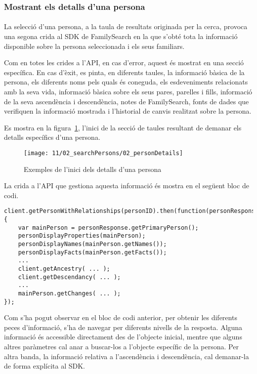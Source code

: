 \subsubsection{Mostrant els detalls d'una persona}

\paragraph{}
La selecció d'una persona, a la taula de resultats originada per la cerca, provoca una segona crida al SDK de FamilySearch en la que s'obté tota la informació disponible sobre la persona seleccionada i els seus familiars.

Com en totes les crides a l'API, en cas d'error, aquest és mostrat en una secció específica. En cas d'èxit, es pinta, en diferents taules, la informació bàsica de la persona, els diferents noms pels quals és coneguda, els esdeveniments relacionats amb la seva vida, informació bàsica sobre els seus pares, parelles i fills, informació de la seva ascendència i descendència, notes de FamilySearch, fonts de dades que verifiquen la informació mostrada i l'historial de canvis realitzat sobre la persona.

Es mostra en la figura~\ref{fig:personSearchDetails}, l'inici de la secció de taules resultant de demanar els detalls específics d'una persona.

\begin{figure}[h]
    \texttt{[image: 11/02\_searchPersons/02\_personDetails]}
    \centering
    \caption{Exemples de l'inici dels detalls d'una persona}\label{fig:personSearchDetails}
\end{figure}

La crida a l'API que gestiona aquesta informació és mostra en el següent bloc de codi.

\begin{lstlisting}[style=rawOwn,caption={Crida al SDK per obtenir tota la informació d'una persona}]
client.getPersonWithRelationships(personID).then(function(personResponse) {
    var mainPerson = personResponse.getPrimaryPerson();
    personDisplayProperties(mainPerson);
    personDisplayNames(mainPerson.getNames());
    personDisplayFacts(mainPerson.getFacts());
    ...
    client.getAncestry( ... );
    client.getDescendancy( ... );
    ...
    mainPerson.getChanges( ... );
});
\end{lstlisting}

Com s'ha pogut observar en el bloc de codi anterior, per obtenir les diferents peces d'informació, s'ha de navegar per diferents nivells de la resposta. Alguna informació és accessible directament des de l'objecte inicial, mentre que alguns altres paràmetres cal anar a buscar-los a l'objecte específic de la persona. Per altra banda, la informació relativa a l'ascendència i descendència, cal demanar-la de forma explícita al SDK.

